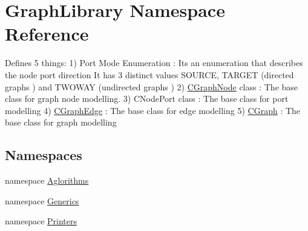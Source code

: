 \hypertarget{namespace_graph_library}{}\section{Graph\+Library Namespace Reference}
\label{namespace_graph_library}


Defines 5 things\+: 1) Port Mode Enumeration \+: Its an enumeration that describes the node port direction It has 3 distinct values S\+O\+U\+R\+C\+E, T\+A\+R\+G\+E\+T (directed graphs ) and T\+W\+O\+W\+A\+Y (undirected graphs ) 2) \hyperlink{class_graph_library_1_1_c_graph_node}{C\+Graph\+Node} class \+: The base class for graph node modelling. 3) C\+Node\+Port class \+: The base class for port modelling 4) \hyperlink{class_graph_library_1_1_c_graph_edge}{C\+Graph\+Edge} \+: The base class for edge modelling 5) \hyperlink{class_graph_library_1_1_c_graph}{C\+Graph} \+: The base class for graph modelling  


\subsection*{Namespaces}
\begin{DoxyCompactItemize}
\item 
namespace \hyperlink{namespace_graph_library_1_1_aglorithms}{Aglorithms}
\item 
namespace \hyperlink{namespace_graph_library_1_1_generics}{Generics}
\item 
namespace \hyperlink{namespace_graph_library_1_1_printers}{Printers}
\end{DoxyCompactItemize}
